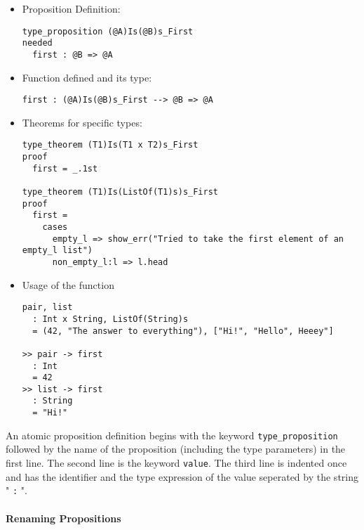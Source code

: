 \documentclass{article}
\begin{document}
\begin{itemize}
\begin{itemize}
\item Proposition Definition:

\begin{verbatim}
type_proposition (@A)Is(@B)s_First
needed
  first : @B => @A
\end{verbatim}

\item Function defined and its type:

\begin{verbatim}
first : (@A)Is(@B)s_First --> @B => @A
\end{verbatim}

\item Theorems for specific types:

\begin{verbatim}
type_theorem (T1)Is(T1 x T2)s_First
proof
  first = _.1st

type_theorem (T1)Is(ListOf(T1)s)s_First
proof
  first =
    cases
      empty_l => show_err("Tried to take the first element of an empty_l list")
      non_empty_l:l => l.head
\end{verbatim}

\item Usage of the function
\begin{verbatim}
pair, list
  : Int x String, ListOf(String)s
  = (42, "The answer to everything"), ["Hi!", "Hello", Heeey"]

>> pair -> first
  : Int
  = 42
>> list -> first
  : String
  = "Hi!"
\end{verbatim}
\end{itemize}

An atomic proposition definition begins with the keyword
\texttt{type_proposition} followed by the name of the proposition (including
the type parameters) in the first line. The second line is the keyword
\texttt{value}. The third line is indented once and has the identifier and the
type expression of the value seperated by the string " \texttt{:} ".

\end{itemize}

\paragraph{Renaming Propositions}
\end{document}
